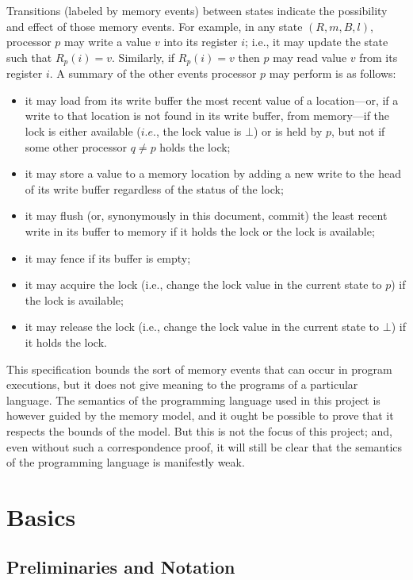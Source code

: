 \documentclass[11pt]{article}
\begin{document}
Transitions (labeled by memory events) between states indicate the possibility and effect of those memory events. For example, in any state $(R,m,B,l)$, processor $p$ may write a value $v$ into its register $i$; i.e., it may update the state such that $R_p(i) = v$. Similarly, if $R_p(i) = v$ then $p$ may read value $v$ from its register $i$. A summary of the other events processor $p$ may perform is as follows: \begin{itemize}
	\item it may load from its write buffer the most recent value of a location---or, if a write to that location is not found in its write buffer, from memory---if the lock is either available ($i.e.$, the lock value is $\bot$) or is held by $p$, but not if some other processor $q \neq p$ holds the lock;
	\item it may store a value to a memory location by adding a new write to the head of its write buffer regardless of the status of the lock; 
	\item it may flush (or, synonymously in this document, commit) the least recent write in its buffer to memory if it holds the lock or the lock is available;  
	\item it may fence if its buffer is empty;
	\item it may acquire the lock (i.e., change the lock value in the current state to $p$) if the lock is available; 
	\item it may release the lock (i.e., change the lock value in the current state to $\bot$) if it holds the lock.
\end{itemize}

This specification bounds the sort of memory events that can occur in program executions, but it does not give meaning to the programs of a particular language. The semantics of the programming language used in this project is however guided by the memory model, and it ought be possible to prove that it respects the bounds of the model. But this is not the focus of this project; and, even without such a correspondence proof, it will still be clear that the semantics of the programming language is manifestly weak. 


\section{Basics}

\subsection{Preliminaries and Notation}
\end{document}
